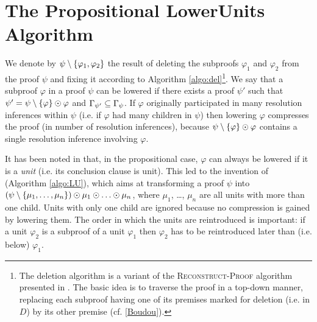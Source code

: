 
\section{The Propositional LowerUnits Algorithm}
\label{sec:PropositionalLU}

We denote by $\psi \setminus \{\varphi_1, \varphi_2\}$ the result of deleting the subproofs $\varphi_1$ and $\varphi_2$ from the proof $\psi$ and fixing it according to Algorithm \ref{algo:del}\footnote{
  The deletion algorithm is a variant of the \textsc{Reconstruct-Proof} algorithm presented in \cite{RP11}.
  The basic idea is to traverse the proof in a top-down manner, replacing
  each subproof having one of its premises marked for deletion (i.e. in $D$) by its other premise (cf. \ref{Boudou}).
}. 
We say that a subproof $\varphi$ in a proof $\psi$ can be lowered 
if there exists a proof
$\psi'$ such that $\psi' = \psi \setminus \{\varphi\} \odot \varphi$ and
$\Gamma_{\psi'} \subseteq \Gamma_{\psi}$. If $\varphi$ originally participated in many resolution inferences within $\psi$ (i.e. if $\varphi$ had many children in $\psi$) then lowering $\varphi$ compresses the proof (in number of resolution inferences), because $\psi \setminus \{\varphi\} \odot \varphi$ contains a single resolution inference involving $\varphi$.

%
It has been noted in \cite{LURPI} that, in the propositional case, $\varphi$ can always be lowered if it is a \emph{unit} (i.e. its conclusion clause is unit). This led to the invention of {\LowerUnits} (Algorithm \ref{algo:LU}), which aims at transforming a proof $\psi$ into $(\psi \setminus \{\mu_1,\ldots,\mu_n\}) \odot \mu_1 \odot \ldots \odot \mu_n$, where $\mu_1$, \ldots, $\mu_n$ are all units with more than one child. Units with only one child are ignored because no compression is gained by lowering them. The order in which the units are reintroduced is important:
if a unit $\varphi_2$ is a subproof of a unit
$\varphi_1$ then $\varphi_2$ has to be reintroduced later than (i.e. below) $\varphi_1$.


\newlength\algowd
\def\savewd#1{\setbox0=\hbox{#1\hspace{.7in}}\algowd=\wd0\relax#1}
\newcommand\algolines[2]{\savewd{#1}%
  \tcp*{\parbox[t]{\dimexpr\algowidth-\algowd}{#2}}}



